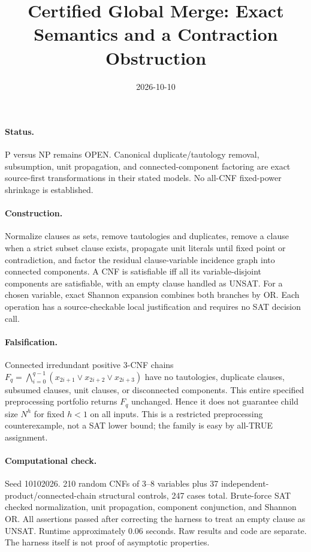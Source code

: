 \documentclass{article}
\begin{document}
\title{Certified Global Merge: Exact Semantics and a Contraction Obstruction}
\date{2026-10-10}\maketitle
\paragraph{Status.} P versus NP remains OPEN. Canonical duplicate/tautology removal, subsumption, unit propagation, and connected-component factoring are exact source-first transformations in their stated models. No all-CNF fixed-power shrinkage is established.
\paragraph{Construction.} Normalize clauses as sets, remove tautologies and duplicates, remove a clause when a strict subset clause exists, propagate unit literals until fixed point or contradiction, and factor the residual clause-variable incidence graph into connected components. A CNF is satisfiable iff all its variable-disjoint components are satisfiable, with an empty clause handled as UNSAT. For a chosen variable, exact Shannon expansion combines both branches by OR. Each operation has a source-checkable local justification and requires no SAT decision call.
\paragraph{Falsification.} Connected irredundant positive 3-CNF chains
$F_q=\bigwedge_{i=0}^{q-1}(x_{2i+1}\vee x_{2i+2}\vee x_{2i+3})$
have no tautologies, duplicate clauses, subsumed clauses, unit clauses, or disconnected components. This entire specified preprocessing portfolio returns $F_q$ unchanged. Hence it does not guarantee child size $N^h$ for fixed $h<1$ on all inputs. This is a restricted preprocessing counterexample, not a SAT lower bound; the family is easy by all-TRUE assignment.
\paragraph{Computational check.} Seed 10102026. 210 random CNFs of 3--8 variables plus 37 independent-product/connected-chain structural controls, 247 cases total. Brute-force SAT checked normalization, unit propagation, component conjunction, and Shannon OR. All assertions passed after correcting the harness to treat an empty clause as UNSAT. Runtime approximately 0.06 seconds. Raw results and code are separate. The harness itself is not proof of asymptotic properties.
\end{document}

